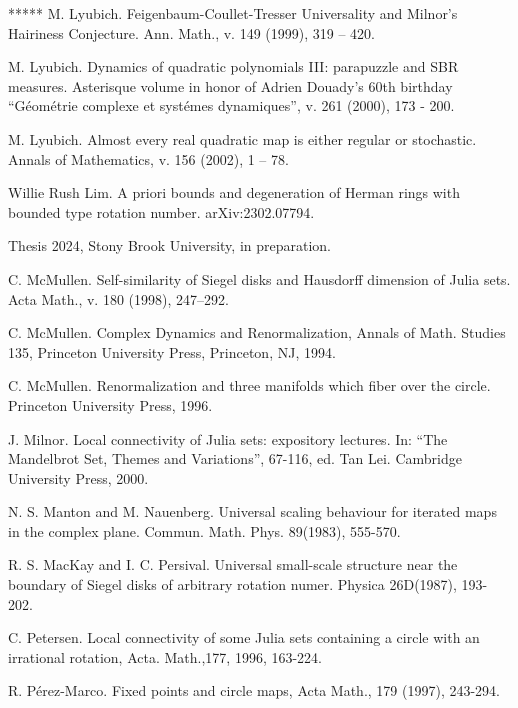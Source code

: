 \documentclass{amsart}
\newcommand{\1}{{\mathbb 1 }}
\theoremstyle{remark}
\numberwithin{equation}{section}
\theoremstyle{definition}
\begin{document}
\begin{thebibliography}{*****}
 M. Lyubich. Feigenbaum-Coullet-Tresser Universality and Milnor’s Hairiness Conjecture. Ann. Math., v. 149 (1999), 319 -- 420.


 M. Lyubich. Dynamics of quadratic polynomials III: parapuzzle and SBR measures. Asterisque volume in honor of Adrien Douady's 60th birthday
``G\'eom\'etrie complexe et syst\'emes dynamiques'', v. 261 (2000), 173 - 200.

 M. Lyubich. Almost every real quadratic map is either regular or stochastic. Annals of Mathematics, v. 156 (2002), 1 -- 78.




 Willie Rush Lim. A priori bounds and degeneration of Herman rings with bounded type rotation number. arXiv:2302.07794.

\noindent Thesis 2024, Stony Brook University, in preparation.





 C. McMullen. Self-similarity of Siegel disks and Hausdorff dimension of Julia sets. Acta Math., v. 180 (1998), 247--292.  
  
 C. McMullen.  Complex Dynamics and Renormalization, Annals of Math. Studies 135, Princeton University Press, Princeton, NJ, 1994.
  
 C. McMullen. Renormalization and three manifolds which fiber over the circle. Princeton University Press, 1996.

 J. Milnor. Local connectivity of Julia sets: expository lectures.
     In: ``The Mandelbrot Set, Themes and Variations'',  67-116, ed. Tan Lei.  
     Cambridge University Press, 2000.
     


 N. S. Manton and M. Nauenberg. Universal scaling behaviour for iterated maps in the complex plane. Commun. Math. Phys. 89(1983), 555-570.


 R. S. MacKay and I. C. Persival. Universal small-scale structure near the boundary of Siegel disks of arbitrary rotation numer. Physica 26D(1987), 193-202.



 C. Petersen. Local connectivity of some Julia sets containing a circle with an irrational rotation, Acta. Math.,177, 1996, 163-224.


  R. P\'erez-Marco. Fixed points and circle maps, Acta Math., 179 (1997), 243-294.





\end{thebibliography}
\end{document}
